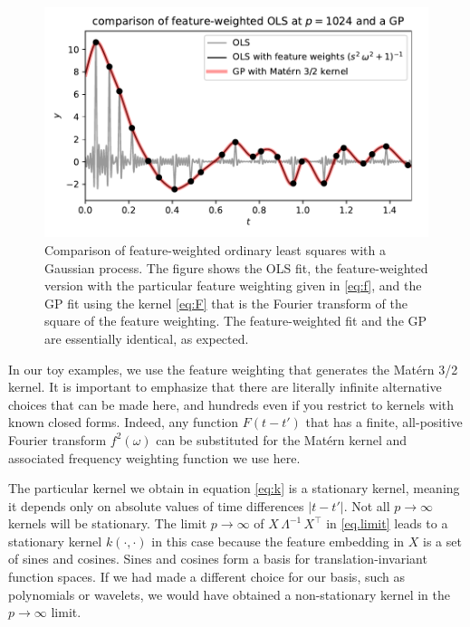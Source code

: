 \documentclass[12pt,letterpaper]{article}
\newlength{\figurewidth}
\begin{document}
\begin{figure}[t]
    \begin{mdframed}
    \includegraphics[width=\figurewidth]{paper/GP.pdf}
    \caption{Comparison of feature-weighted ordinary least squares with a Gaussian process. The figure shows the OLS fit, the feature-weighted version with the particular feature weighting given in \eqref{eq:f}, and the GP fit using the kernel \eqref{eq:F} that is the Fourier transform of the square of the feature weighting. The feature-weighted fit and the GP are essentially identical, as expected.}
    \label{fig:gp}
    \end{mdframed}
\end{figure}

In our toy examples, we use the feature weighting that generates the Mat\'ern 3/2 kernel.
It is important to emphasize that there are literally infinite alternative choices that can be made here, and hundreds even if you restrict to kernels with known closed forms.
Indeed, any function $F(t-t')$ that has a finite, all-positive Fourier transform $f^2(\omega)$ can be substituted for the Mat\'ern kernel and associated frequency weighting function we use here.

The particular kernel we obtain in equation \eqref{eq:k} is a stationary kernel, meaning it depends only on absolute values of time differences $|t - t'|$. Not all $p\rightarrow\infty$ kernels will be stationary. The limit $p\rightarrow\infty$ of $X\,\Lambda^{-1}\,X^\top$ in \eqref{eq.limit} leads to a stationary kernel $k(\cdot,\cdot)$ in this case because the feature embedding in $X$ is a set of sines and cosines.
Sines and cosines form a basis for translation-invariant function spaces.
If we had made a different choice for our basis, such as polynomials or wavelets, we would have obtained a non-stationary kernel in the $p\rightarrow\infty$ limit.
\end{document}
